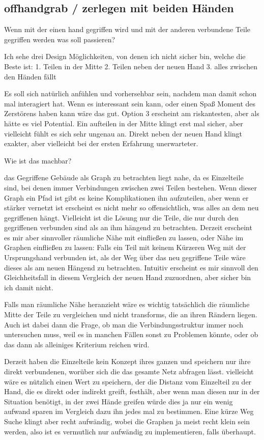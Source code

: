 \documentclass[11pt]{article} %
\begin{document}
\subsection{offhandgrab / zerlegen mit beiden Händen}

Wenn mit der einen hand gegriffen wird und mit der anderen verbundene Teile gegriffen werden was soll passieren?

Ich sehe drei Design Möglichkeiten, von denen ich nicht sicher bin, welche die Beste ist:
1. Teilen in der Mitte
2. Teilen neben der neuen Hand
3. alles zwischen den Händen fällt

Es soll sich natürlich anfühlen und vorhersehbar sein, nachdem man damit schon mal interagiert hat.
Wenn es interessant sein kann, oder einen Spaß Moment des Zerstörens haben kann wäre das gut.
Option 3 erscheint am riskantesten, aber als hätte es viel Potential. 
Ein aufteilen in der Mitte klingt erst mal sicher, aber vielleicht fühlt es sich sehr ungenau an.
Direkt neben der neuen Hand klingt exakter, aber vielleicht bei der ersten Erfahrung unerwarteter.

Wie ist das machbar?

das Gegriffene Gebäude als Graph zu betrachten liegt nahe, da es Einzelteile sind, bei denen immer Verbindungen zwischen zwei Teilen bestehen.
Wenn dieser Graph ein Pfad ist gibt es keine Komplikationen ihn aufzuteilen, aber wenn er stärker vernetzt ist erscheint es nicht mehr so offensichtlich, was alles an dem neu gegriffenen hängt.
Vielleicht ist die Lösung nur die Teile, die nur durch den gegriffenen verbunden sind als an ihm hängend zu betrachten.
Derzeit erscheint es mir aber sinnvoller räumliche Nähe mit einfließen zu lassen, oder Nähe im Graphen einfließen zu lassen: Falls ein Teil mit keinem Kürzeren Weg mit der Ursprungshand verbunden ist, als der Weg über das neu gegriffene Teile wäre dieses als am neuen Hängend zu betrachten.
Intuitiv erscheint es mir sinnvoll den Gleichheitsfall in diesem Vergleich der neuen Hand zuzuordnen, aber sicher bin ich damit nicht.

Falls man räumliche Nähe heranzieht wäre es wichtig tatsächlich die räumliche Mitte der Teile zu vergleichen und nicht transforms, die an ihren Rändern liegen. Auch ist dabei dann die Frage, ob man die Verbindungsstruktur immer noch untersuchen muss, weil es in manchen Fällen sonst zu Problemen könnte, oder ob das dann als alleiniges Kriterium reichen wird.

Derzeit haben die Einzelteile kein Konzept ihres ganzen und speichern nur ihre direkt verbundenen, worüber sich die das gesamte Netz abfragen lässt. vielleicht wäre es nützlich einen Wert zu speichern, der die Distanz vom Einzelteil zu der Hand, die es direkt oder indirekt greift, festhält, aber wenn man diesen nur in der Situation benötigt, in der zwei Hände greifen würde dies ja nur ein wenig aufwand sparen im Vergleich dazu ihn jedes mal zu bestimmen.
Eine kürze Weg Suche klingt aber recht aufwändig, wobei die Graphen ja meist recht klein sein werden, also ist es vermutlich nur aufwändig zu implementieren, falls überhaupt.
\end{document}
